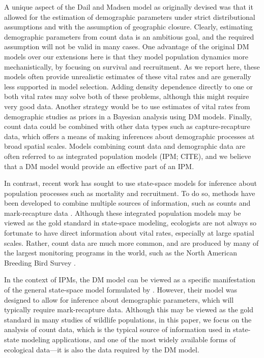 \documentclass[12pt]{article}
\begin{document}
A unique aspect of the Dail and Madsen model as originally
devised was that it allowed for the estimation of demographic
parameters under strict distributional assumptions and with the
assumption of geographic closure. Clearly, estimating
demographic parameters from count data is an ambitious goal, and
the required assumption will not be valid in many cases. One
advantage of the original DM models over our extensions here is
that they model population dynamics more mechanistically, by
focusing on survival and recruitment. As we report here, these
models often provide unrealistic estimates of these vital rates
and are generally less supported in model selection. Adding
density dependence directly to one or both vital rates may solve
both of these problems, although this might require very good
data. Another strategy would be to use estimates of vital rates
from demographic studies as priors in a Bayesian analysis using
DM models. Finally, count data could be combined with other data
types such as capture-recapture data, which offers a means of
making inferences about demographic processes at broad spatial
scales. Models combining count data and demographic data are
often referred to as integrated population models (IPM; CITE),
and we believe that a DM model would provide an effective part
of an IPM.


In contrast, recent work has sought to use state-space
models for inference about population processes such as mortality and
recruitment. To do so, methods have been developed to combine multiple
sources of information, such as counts and mark-recapture data
\citep{besbeas_etal:2002, buckland_etal:2004,
  schaub_etal:2007}. Although these integrated
population models may be viewed as the gold standard in state-space
modeling, ecologists are not always so fortunate to have direct
information about vital rates, especially at large spatial scales.
Rather, count data are much more common, and
are produced by many of the largest monitoring programs in the world,
such as the North American Breeding Bird Survey
\citep[BBS;][]{robbins_etal:1986}.

In the context of IPMs, the DM model can be viewed as a specific
manifestation of the general state-space model formulated by
\citep{buckland_etal:2004}. However, their model was designed to
allow for inference about demographic parameters, which will
typically require mark-recapture data. Although this may be viewed
as the gold standard in many studies of wildlife populations, in
this paper, we focus on the analysis of count data, which is the
typical source of information used in state-state modeling
applications, and one of the most widely available forms of
ecological data---it is also the data required by the DM model.
\end{document}
